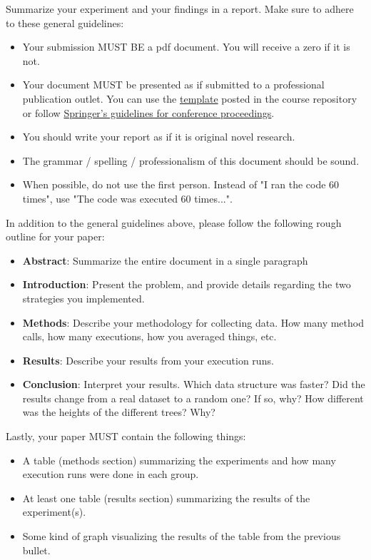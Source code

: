 \documentclass[paper=a4, fontsize=11pt, parskip=full]{scrartcl} %
\numberwithin{equation}{section} %
\numberwithin{figure}{section} %
\numberwithin{table}{section} %
\begin{document}
Summarize your experiment and your findings in a report. Make sure to adhere to these general guidelines:

\begin{itemize}
	\item Your submission MUST BE a pdf document. You will receive a zero if it is not.
	\item Your document MUST be presented as if submitted to a professional publication outlet. You can use the \href{https://markfloryan.github.io/dsa1/homeworks/WordPaperTemplate.zip}{template} posted in the course repository or follow \href{https://www.springer.com/us/computer-science/lncs/conference-proceedings-guidelines}{Springer's guidelines for conference proceedings}.
	\item You should write your report as if it is original novel research.
	\item The grammar / spelling / professionalism of this document should be sound.
	\item When possible, do not use the first person. Instead of "I ran the code 60 times", use "The code was executed 60 times...".
\end{itemize}

In addition to the general guidelines above, please follow the following rough outline for your paper:

\begin{itemize}
	\item \textbf{Abstract}: Summarize the entire document in a single paragraph
	\item \textbf{Introduction}: Present the problem, and provide details regarding the two strategies you implemented.
	\item \textbf{Methods}: Describe your methodology for collecting data. How many method calls, how many executions, how you averaged things, etc.
	\item \textbf{Results}: Describe your results from your execution runs.
	\item \textbf{Conclusion}: Interpret your results. Which data structure was faster? Did the results change from a real dataset to a random one? If so, why? How different was the heights of the different trees? Why?
\end{itemize}

Lastly, your paper MUST contain the following things:

\begin{itemize}
	\item A table (methods section) summarizing the experiments and how many execution runs were done in each group.
	\item At least one table (results section) summarizing the results of the experiment(s).
	\item Some kind of graph visualizing the results of the table from the previous bullet.
\end{itemize}


\end{document}
